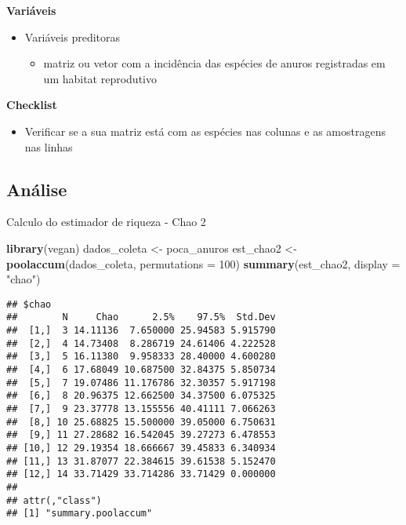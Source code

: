 \documentclass[
]{book}
\newenvironment{Shaded}{\begin{snugshade}}{\end{snugshade}}
\newcommand{\DataTypeTok}[1]{\textcolor[rgb]{0.13,0.29,0.53}{#1}}
\newcommand{\DecValTok}[1]{\textcolor[rgb]{0.00,0.00,0.81}{#1}}
\newcommand{\KeywordTok}[1]{\textcolor[rgb]{0.13,0.29,0.53}{\textbf{#1}}}
\newcommand{\NormalTok}[1]{#1}
\newcommand{\StringTok}[1]{\textcolor[rgb]{0.31,0.60,0.02}{#1}}
\providecommand{\tightlist}{%
  \setlength{\itemsep}{0pt}\setlength{\parskip}{0pt}}
\begin{document}
\textbf{Variáveis}

\begin{itemize}
\tightlist
\item
  Variáveis preditoras

  \begin{itemize}
  \tightlist
  \item
    matriz ou vetor com a incidência das espécies de anuros registradas em um habitat reprodutivo
  \end{itemize}
\end{itemize}

\textbf{Checklist}

\begin{itemize}
\tightlist
\item
  Verificar se a sua matriz está com as espécies nas colunas e as amostragens nas linhas
\end{itemize}

\hypertarget{anuxe1lise-2}{%
\subsection{Análise}\label{anuxe1lise-2}}

Calculo do estimador de riqueza - Chao 2

\begin{Shaded}
\begin{Highlighting}[]
\KeywordTok{library}\NormalTok{(vegan)}
\NormalTok{dados_coleta <-}\StringTok{ }\NormalTok{poca_anuros}
\NormalTok{est_chao2 <-}\StringTok{ }\KeywordTok{poolaccum}\NormalTok{(dados_coleta, }\DataTypeTok{permutations =} \DecValTok{100}\NormalTok{)}
\KeywordTok{summary}\NormalTok{(est_chao2, }\DataTypeTok{display =} \StringTok{"chao"}\NormalTok{)}
\end{Highlighting}
\end{Shaded}

\begin{verbatim}
## $chao
##        N     Chao      2.5%    97.5%  Std.Dev
##  [1,]  3 14.11136  7.650000 25.94583 5.915790
##  [2,]  4 14.73408  8.286719 24.61406 4.222528
##  [3,]  5 16.11380  9.958333 28.40000 4.600280
##  [4,]  6 17.68049 10.687500 32.84375 5.850734
##  [5,]  7 19.07486 11.176786 32.30357 5.917198
##  [6,]  8 20.96375 12.662500 34.37500 6.075325
##  [7,]  9 23.37778 13.155556 40.41111 7.066263
##  [8,] 10 25.68825 15.500000 39.05000 6.750631
##  [9,] 11 27.28682 16.542045 39.27273 6.478553
## [10,] 12 29.19354 18.666667 39.45833 6.340934
## [11,] 13 31.87077 22.384615 39.61538 5.152470
## [12,] 14 33.71429 33.714286 33.71429 0.000000
## 
## attr(,"class")
## [1] "summary.poolaccum"
\end{verbatim}
\end{document}
